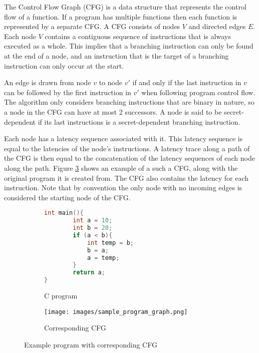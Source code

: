 The Control Flow Graph (CFG) is a data structure that represents the control flow of a function. 
If a program has multiple functions then each function is represented by a separate CFG. 
A CFG consists of nodes $V$ and directed edges $E$. Each node $V$ contains a 
contiguous sequence of instructions that is always executed as a whole. This implies that a branching instruction can only be found at the end of a node, 
and an instruction that is the target of a branching instruction can only occur at the start.

An edge is drawn from node $v$ to node $v'$ if and only if the last instruction in $v$ can be followed by the first instruction in $v'$ 
when following program control flow. The algorithm only considers branching instructions that are binary in nature, so a node in the CFG can have at most 2 successors. 
A node is said to be secret-dependent if its last instructions is a 
secret-dependent branching instruction. 

Each node has a latency sequence associated with it. This latency sequence is equal to the latencies of the node's instructions.  
A latency trace along a path of the CFG is then equal to the concatenation of the latency sequences of each node along the path.
Figure \ref{fig:exampleCFG} shows an example of a such a CFG, along with the original program it is created from. The CFG also contains the latency for each instruction. Note that by convention the only node with no incoming edges is considered the starting node of the CFG. 

\begin{figure}
\centering
\begin{subfigure}{.4\textwidth}
  \centering
  
    \begin{lstlisting}[language=C]
int main(){
        int a = 10; 
        int b = 20; 
        if (a < b){
            int temp = b; 
            b = a; 
            a = temp; 
        } 
        return a;  
}\end{lstlisting}
  \caption{C program}
  \label{fig:c_program}
\end{subfigure}%
\begin{subfigure}{.7\textwidth}
  \centering
  \texttt{[image: images/sample\_program\_graph.png]}
  \caption{Corresponding CFG}
  \label{fig:c_program_cfg}
\end{subfigure}
\caption{Example program with corresponding CFG}
\label{fig:exampleCFG}
\end{figure}

